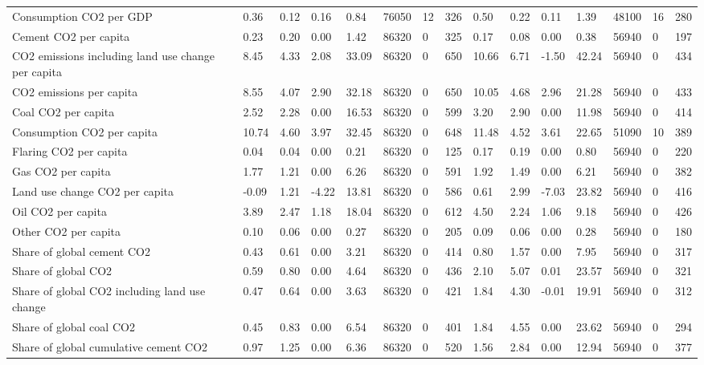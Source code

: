 \begin{longtable}{lllllllllllllll}
Consumption CO2 per GDP & 0.36 & 0.12 & 0.16 & 0.84 & 76050 & 12 & 326 & 0.50 & 0.22 & 0.11 & 1.39 & 48100 & 16 & 280\\
\addlinespace
Cement CO2 per capita & 0.23 & 0.20 & 0.00 & 1.42 & 86320 & 0 & 325 & 0.17 & 0.08 & 0.00 & 0.38 & 56940 & 0 & 197\\
CO2 emissions including land use change per capita & 8.45 & 4.33 & 2.08 & 33.09 & 86320 & 0 & 650 & 10.66 & 6.71 & -1.50 & 42.24 & 56940 & 0 & 434\\
CO2 emissions per capita & 8.55 & 4.07 & 2.90 & 32.18 & 86320 & 0 & 650 & 10.05 & 4.68 & 2.96 & 21.28 & 56940 & 0 & 433\\
Coal CO2 per capita & 2.52 & 2.28 & 0.00 & 16.53 & 86320 & 0 & 599 & 3.20 & 2.90 & 0.00 & 11.98 & 56940 & 0 & 414\\
Consumption CO2 per capita & 10.74 & 4.60 & 3.97 & 32.45 & 86320 & 0 & 648 & 11.48 & 4.52 & 3.61 & 22.65 & 51090 & 10 & 389\\
\addlinespace
Flaring CO2 per capita & 0.04 & 0.04 & 0.00 & 0.21 & 86320 & 0 & 125 & 0.17 & 0.19 & 0.00 & 0.80 & 56940 & 0 & 220\\
Gas CO2 per capita & 1.77 & 1.21 & 0.00 & 6.26 & 86320 & 0 & 591 & 1.92 & 1.49 & 0.00 & 6.21 & 56940 & 0 & 382\\
Land use change CO2 per capita & -0.09 & 1.21 & -4.22 & 13.81 & 86320 & 0 & 586 & 0.61 & 2.99 & -7.03 & 23.82 & 56940 & 0 & 416\\
Oil CO2 per capita & 3.89 & 2.47 & 1.18 & 18.04 & 86320 & 0 & 612 & 4.50 & 2.24 & 1.06 & 9.18 & 56940 & 0 & 426\\
Other CO2 per capita & 0.10 & 0.06 & 0.00 & 0.27 & 86320 & 0 & 205 & 0.09 & 0.06 & 0.00 & 0.28 & 56940 & 0 & 180\\
\addlinespace
Share of global cement CO2 & 0.43 & 0.61 & 0.00 & 3.21 & 86320 & 0 & 414 & 0.80 & 1.57 & 0.00 & 7.95 & 56940 & 0 & 317\\
Share of global CO2 & 0.59 & 0.80 & 0.00 & 4.64 & 86320 & 0 & 436 & 2.10 & 5.07 & 0.01 & 23.57 & 56940 & 0 & 321\\
Share of global CO2 including land use change & 0.47 & 0.64 & 0.00 & 3.63 & 86320 & 0 & 421 & 1.84 & 4.30 & -0.01 & 19.91 & 56940 & 0 & 312\\
Share of global coal CO2 & 0.45 & 0.83 & 0.00 & 6.54 & 86320 & 0 & 401 & 1.84 & 4.55 & 0.00 & 23.62 & 56940 & 0 & 294\\
Share of global cumulative cement CO2 & 0.97 & 1.25 & 0.00 & 6.36 & 86320 & 0 & 520 & 1.56 & 2.84 & 0.00 & 12.94 & 56940 & 0 & 377\\

\end{longtable}
